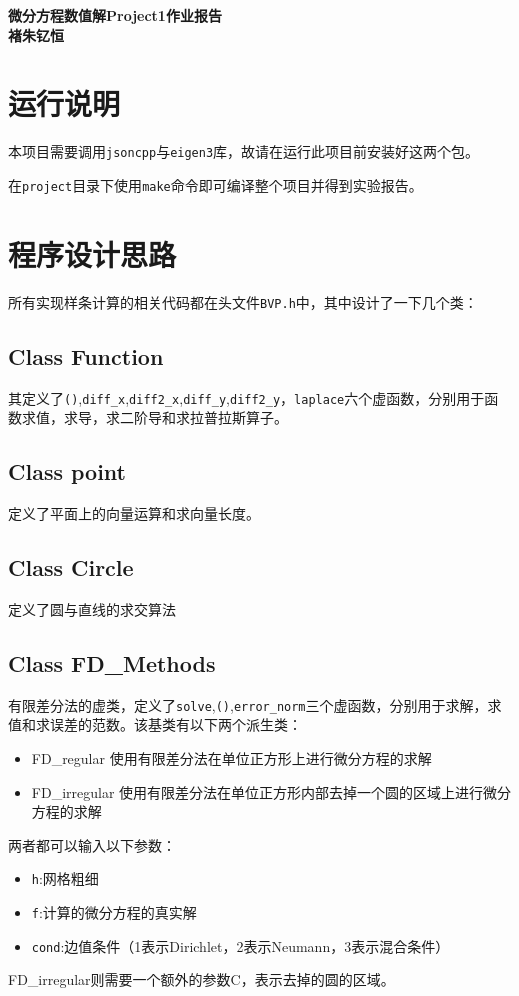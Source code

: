 \documentclass[12]{article}%
\begin{document}
\begin{center}
    \LARGE\songti\textbf{微分方程数值解Project1作业报告} \\%
    \large\kaishu\textbf{褚朱钇恒}%
\end{center}
\section{运行说明}
    本项目需要调用\verb|jsoncpp|与\verb|eigen3|库，故请在运行此项目前安装好这两个包。

    在\verb|project|目录下使用\verb|make|命令即可编译整个项目并得到实验报告。

\section{程序设计思路}
所有实现样条计算的相关代码都在头文件\verb|BVP.h|中，其中设计了一下几个类：
\subsection{Class Function}
其定义了\verb|()|,\verb|diff_x|,\verb|diff2_x|,\verb|diff_y|,\verb|diff2_y|，\verb|laplace|六个虚函数，分别用于函数求值，求导，求二阶导和求拉普拉斯算子。

\subsection{Class point}
定义了平面上的向量运算和求向量长度。

\subsection{Class Circle}
定义了圆与直线的求交算法


\subsection{Class FD\_Methods}
有限差分法的虚类，定义了\verb|solve|,\verb|()|,\verb|error_norm|三个虚函数，分别用于求解，求值和求误差的范数。该基类有以下两个派生类：
\begin{itemize}
    \item FD\_regular 使用有限差分法在单位正方形上进行微分方程的求解
    \item FD\_irregular 使用有限差分法在单位正方形内部去掉一个圆的区域上进行微分方程的求解 
\end{itemize}
两者都可以输入以下参数：
\begin{itemize}
    \item \verb|h|:网格粗细
    \item \verb|f|:计算的微分方程的真实解
    \item \verb|cond|:边值条件（1表示Dirichlet，2表示Neumann，3表示混合条件）
\end{itemize}
FD\_irregular则需要一个额外的参数C，表示去掉的圆的区域。
\end{document}
